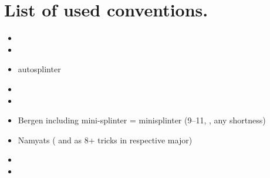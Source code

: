 \documentclass[12pt,a4paper,twoside]{article}
\begin{document}
  \section{List of used conventions.}
  \begin{itemize}
    \item  \pagebreak[2]
    \item  \pagebreak[2]
    \item autosplinter \pagebreak[2]
    \item  \pagebreak[2]
    \item  \pagebreak[2]
    \item Bergen including mini-splinter \newline \pagebreak[2]
       = minisplinter (9--11, , any shortness) \pagebreak[2]
    \item Namyats ( and  as 8+ tricks in respective major) \pagebreak[2]
    \item  \pagebreak[2]
    \item  \pagebreak[2]
  \end{itemize}

   \pagebreak[2]
\end{document}
